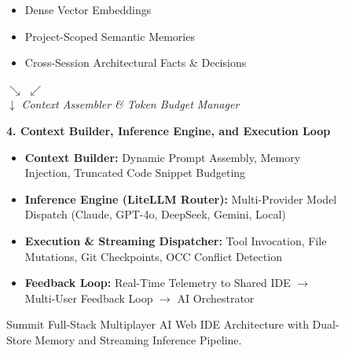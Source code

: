 \documentclass[conference]{IEEEtran}
\begin{document}
\begin{figure}[t]
{\begin{minipage}{0.96\linewidth}
\begin{minipage}[t]{0.48\linewidth}
\begin{itemize}
    \item Dense Vector Embeddings
    \item Project-Scoped Semantic Memories
    \item Cross-Session Architectural Facts \& Decisions
\end{itemize}
\end{minipage}
\vspace{0.2cm}
\begin{center}
$\searrow$ \hspace{6cm} $\swarrow$ \\
$\downarrow$ \textit{Context Assembler \& Token Budget Manager}
\end{center}
\textbf{4. Context Builder, Inference Engine, and Execution Loop}
\begin{itemize}
    \item \textbf{Context Builder:} Dynamic Prompt Assembly, Memory Injection, Truncated Code Snippet Budgeting
    \item \textbf{Inference Engine (LiteLLM Router):} Multi-Provider Model Dispatch (Claude, GPT-4o, DeepSeek, Gemini, Local)
    \item \textbf{Execution \& Streaming Dispatcher:} Tool Invocation, File Mutations, Git Checkpoints, OCC Conflict Detection
    \item \textbf{Feedback Loop:} Real-Time Telemetry to Shared IDE $\rightarrow$ Multi-User Feedback Loop $\rightarrow$ AI Orchestrator
\end{itemize}
\end{minipage}
}
\caption{Summit Full-Stack Multiplayer AI Web IDE Architecture with Dual-Store Memory and Streaming Inference Pipeline.}
\label{fig:arch}
\end{figure}
\end{document}
